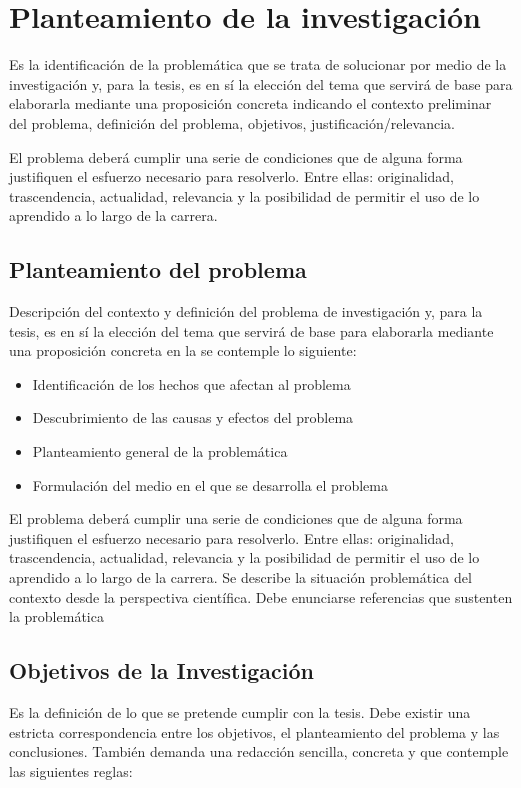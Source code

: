 \chapter{Planteamiento de la investigación}
Es la identificación de la problemática que se trata de solucionar por medio de la investigación y, para la tesis, es en sí la elección del tema que servirá de base para elaborarla mediante una proposición concreta indicando el contexto preliminar del problema, definición del problema, objetivos, justificación/relevancia. 

El problema deberá cumplir una serie de condiciones que de alguna forma justifiquen el esfuerzo necesario para resolverlo. Entre ellas: originalidad, trascendencia, actualidad, relevancia y la posibilidad de permitir el uso de lo aprendido a lo largo de la carrera.

\section{Planteamiento del problema}
Descripción del contexto y definición del problema de investigación y, para la tesis, es en sí la elección del tema que servirá de base para elaborarla mediante una proposición concreta en la se contemple lo siguiente:

\begin{itemize}
    \item Identificación de los hechos que afectan al problema 
    \item Descubrimiento de las causas y efectos del problema 
    \item Planteamiento general de la problemática 
    \item Formulación del medio en el que se desarrolla el problema 
\end{itemize}

El problema deberá cumplir una serie de condiciones que de alguna forma justifiquen el esfuerzo necesario para resolverlo. Entre ellas: originalidad, trascendencia, actualidad, relevancia y la posibilidad de permitir el uso de lo aprendido a lo largo de la carrera. Se describe la situación problemática del contexto desde la perspectiva científica. Debe enunciarse referencias que sustenten la problemática 

\section{Objetivos de la Investigación}
Es la definición de lo que se pretende cumplir con la tesis. Debe existir una estricta correspondencia entre los objetivos, el planteamiento del problema y las conclusiones. También demanda una redacción sencilla, concreta y que contemple las siguientes reglas:

